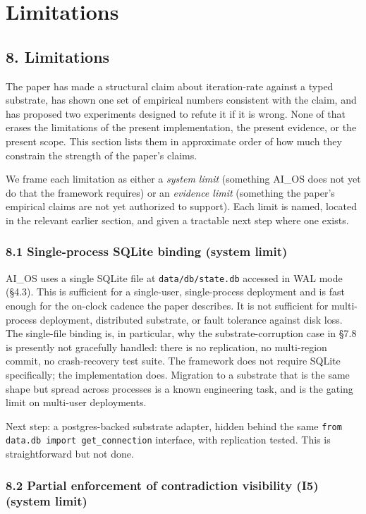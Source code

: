 \documentclass[11pt,letterpaper]{article}
\begin{document}
\section{Limitations}
\subsection*{8. Limitations}

The paper has made a structural claim about iteration-rate against a typed substrate, has shown one set of empirical numbers consistent with the claim, and has proposed two experiments designed to refute it if it is wrong. None of that erases the limitations of the present implementation, the present evidence, or the present scope. This section lists them in approximate order of how much they constrain the strength of the paper's claims.

We frame each limitation as either a \emph{system limit} (something AI\_OS does not yet do that the framework requires) or an \emph{evidence limit} (something the paper's empirical claims are not yet authorized to support). Each limit is named, located in the relevant earlier section, and given a tractable next step where one exists.

\subsubsection*{8.1 Single-process SQLite binding (system limit)}

AI\_OS uses a single SQLite file at \texttt{data/db/state.db} accessed in WAL mode (§4.3). This is sufficient for a single-user, single-process deployment and is fast enough for the on-clock cadence the paper describes. It is not sufficient for multi-process deployment, distributed substrate, or fault tolerance against disk loss. The single-file binding is, in particular, why the substrate-corruption case in §7.8 is presently not gracefully handled: there is no replication, no multi-region commit, no crash-recovery test suite. The framework does not require SQLite specifically; the implementation does. Migration to a substrate that is the same shape but spread across processes is a known engineering task, and is the gating limit on multi-user deployments.

Next step: a postgres-backed substrate adapter, hidden behind the same \texttt{from data.db import get\_connection} interface, with replication tested. This is straightforward but not done.

\subsubsection*{8.2 Partial enforcement of contradiction visibility (I5) (system limit)}
\end{document}
